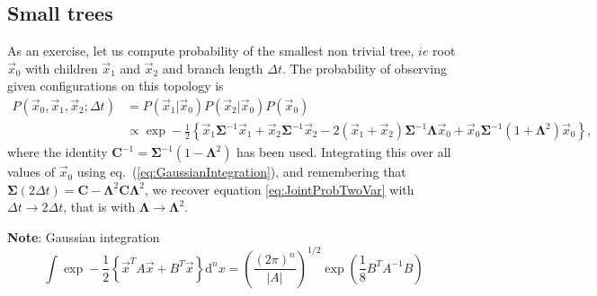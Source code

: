 \documentclass[10pt]{article}
\newcommand{\ddroit}{\textrm{d}}
\newcommand{\xz}{\vec{x}_0}
\newcommand{\xo}{\vec{x}_1}
\newcommand{\xt}{\vec{x}_2}
\newcommand{\Lam}{\bm{\Lambda}}
\newcommand{\Sig}{\bm{\Sigma}}
\begin{document}

\subsection{Small trees} %
\label{sub:small_trees}

As an exercise, let us compute probability of the smallest non trivial tree, $ie$ root $\xz$ with children $\xo$ and $\xt$ and branch length $\Delta t$. The probability of observing given configurations on this topology is 
\begin{equation}
	\begin{split}
		P(\xz,\xo,\xt ; \Delta t) &= P(\xo\vert\xz)P(\xt\vert\xz)P(\xz)\\
		&\propto\exp-\frac{1}{2}\left\{ \xo\Sig^{-1}\xo + \xt\Sig^{-1}\xt - 2(\xo + \xt)\Sig^{-1}\Lam\xz + \xz\Sig^{-1}(1+\Lam^2)\xz \right\},
	\end{split}
\end{equation}
where the identity $\bm{C}^{-1} = \Sig^{-1}(1-\Lam^2)$ has been used.
Integrating this over all values of $\xz$ using eq.~(\ref{eq:GaussianIntegration}), and remembering that $\Sig(2\Delta t) = \bm{C} - \Lam^2\bm{C}\Lam^2$, we recover equation \ref{eq:JointProbTwoVar} with $\Delta t \rightarrow 2\Delta t$, that is with $\Lam\rightarrow\Lam^2$.

\textbf{Note}: Gaussian integration
\begin{equation}
	\label{eq:GaussianIntegration}
	\int\exp-\frac{1}{2}\left\{\vec{x}^TA\vec{x} + B^T\vec{x}\right\}\ddroit^{n}x = \left( \frac{(2\pi)^n}{\vert A\vert} \right)^{1/2}\exp\left(\frac{1}{8}B^TA^{-1}B\right)
\end{equation}
\end{document}
